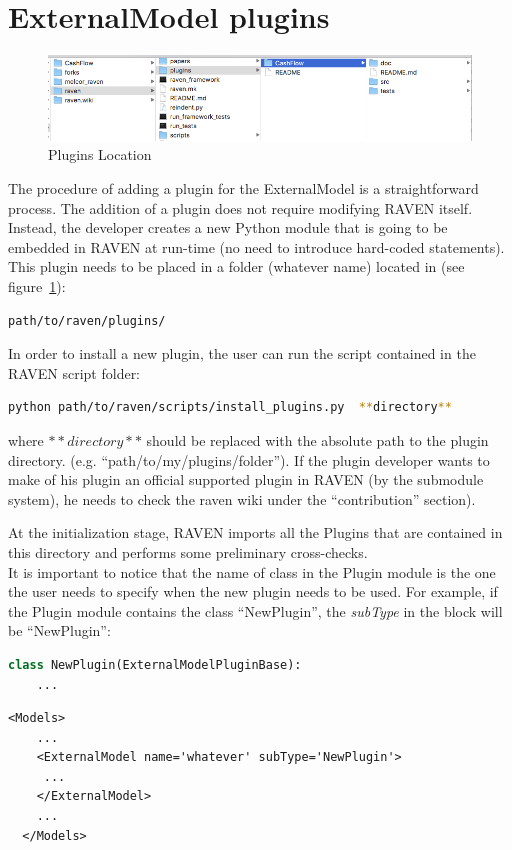 \section{ExternalModel plugins}
\label{sec:newExternalModelPlugin}
\begin{figure}
\centering
\includegraphics[width=1.0\textwidth]{pics/plugins_location.png}
\caption{Plugins Location}
\label{fig:pluginsLocation}
\end{figure}
The procedure of adding a plugin for the ExternalModel is a straightforward  process.
The addition of a plugin does not require modifying RAVEN itself.
Instead, the developer creates a new Python module that is going to be embedded
 in RAVEN at run-time (no need to introduce  hard-coded statements).
 This plugin needs to be placed in a folder (whatever name) located in (see figure~\ref{fig:pluginsLocation}):
\begin{lstlisting}[language=bash]
 path/to/raven/plugins/
\end{lstlisting}
In order to install a new plugin, the user can run the script contained in the RAVEN script folder:
\begin{lstlisting}[language=bash]
 python path/to/raven/scripts/install_plugins.py  **directory**
\end{lstlisting}
where  $**directory**$ should be replaced with the absolute path to the plugin directory.
(e.g. ``path/to/my/plugins/folder''). If the plugin developer wants to make of his plugin
an official supported plugin in RAVEN (by the submodule system), he needs to check
the raven wiki under the ``contribution'' section).

At the initialization stage, RAVEN imports all the Plugins that are contained in this directory and performs some preliminary cross-checks.
\\It is important to notice that the name of class in the Plugin module is the one the user needs to specify when the new plugin
needs to be used. For example, if the Plugin module contains the class 	``NewPlugin'', the \textit{subType} in the  block will be 	``NewPlugin'':
\begin{lstlisting}[language=python]
  class NewPlugin(ExternalModelPluginBase):
    ...
\end{lstlisting}
\begin{lstlisting}[style=XML,morekeywords={name,file}] %moreemph={name,file}]
  <Models>
    ...
    <ExternalModel name='whatever' subType='NewPlugin'>
     ...
    </ExternalModel>
    ...
  </Models>
\end{lstlisting}

